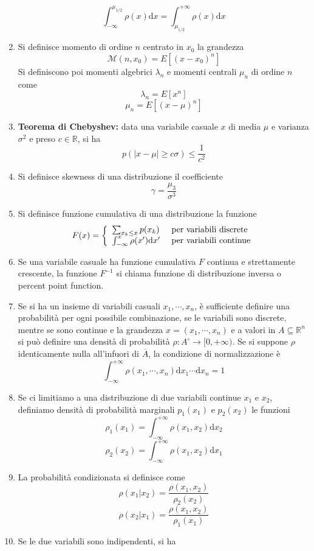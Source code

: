 \documentclass[a4paper,11pt]{article}
\begin{document}
\begin{enumerate}[resume]
	\[\int_{-\infty}^{\mu_{1/2}}\rho(x)\mathrm{d}x=\int_{\mu_{1/2}}^{+\infty}\rho(x)\mathrm{d}x\]
	\item Si definisce momento di ordine $n$ centrato in $x_0$ la grandezza
	\[\mathcal{M}(n,x_0)=E[(x-x_0)^n]\]
	Si definiscono poi momenti algebrici $\lambda_n$ e momenti centrali $\mu_n$ di ordine $n$ come
	\[\lambda_n=E[x^n]\]
	\[\mu_n=E[(x-\mu)^n]\]
	\item\textbf{Teorema di Chebyshev:} data una variabile casuale $x$ di media $\mu$ e varianza $\sigma^2$ e preso $c\in\mathbb{R}$, si ha
	\[p(|x-\mu|\geq c\sigma)\leq\frac{1}{c^2}\]
	\item Si definisce skewness di una distribuzione il coefficiente
	\[\gamma=\frac{\mu_3}{\sigma^3}\]
	\item Si definisce funzione cumulativa di una distribuzione la funzione
	\[F(x)=\left\{\begin{array}{l l}
	\sum_{x_k\leq x}p(x_k) & \textrm{ per variabili discrete} \\
	\int_{-\infty}^{x}\rho(x')\mathrm{d}x' & \textrm{ per variabili continue} \\
	\end{array}\right.\]
	\item Se una variabile casuale ha funzione cumulativa $F$ continua e strettamente crescente, la funzione $F^{-1}$ si chiama funzione di distribuzione inversa o percent point function.
	\item Se si ha un insieme di variabili casuali $x_1,\cdots,x_n$, è sufficiente definire una probabilità per ogni possibile combinazione, se le variabili sono discrete, mentre se sono continue e la grandezza $x=(x_1,\cdots,x_n)$ e a valori in $A\subseteq\mathbb{R}^n$ si può definire una densità di probabilità $\rho\colon A^\circ\to[0,+\infty)$. Se si suppone $\rho$ identicamente nulla all'infuori di $\overline{A}$, la condizione di normalizzazione è 
	\[\int_{-\infty}^{+\infty}\rho(x_1,\cdots,x_n)\mathrm{d}x_1\cdots\mathrm{d}x_n=1\]
	\item Se ci limitiamo a una distribuzione di due variabili continue $x_1$ e $x_2$, definiamo densità di probabilità marginali $p_1(x_1)$ e $p_2(x_2)$ le funzioni
	\[\rho_1(x_1)=\int_{-\infty}^{+\infty}\rho(x_1,x_2)\mathrm{d}x_2\]
	\[\rho_2(x_2)=\int_{-\infty}^{+\infty}\rho(x_1,x_2)\mathrm{d}x_1\]
	\item La probabilità condizionata si definisce come
	\[\rho(x_1|x_2)=\frac{\rho(x_1,x_2)}{\rho_2(x_2)}\]
	\[\rho(x_2|x_1)=\frac{\rho(x_1,x_2)}{\rho_1(x_1)}\]
	\item Se le due variabili sono indipendenti, si ha

\end{enumerate}
\end{document}

